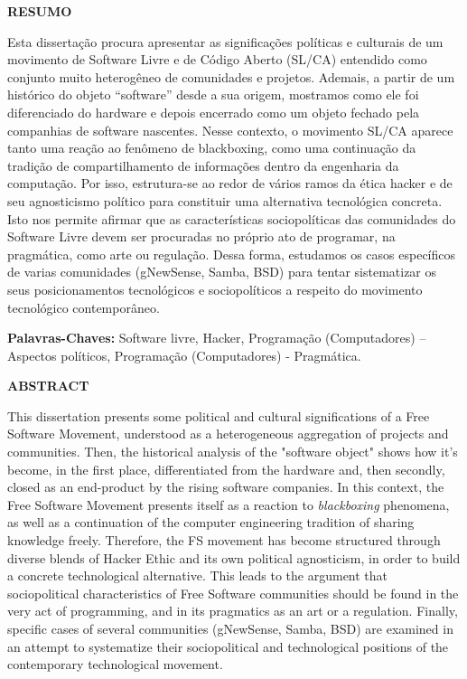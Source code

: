 \begin{center} \textbf{RESUMO} \end{center}

\vspace*{.5cm}

Esta dissertação procura apresentar as significações políticas e culturais de um movimento de Software Livre e de Código Aberto (SL/CA) entendido como conjunto muito heterogêneo de comunidades e projetos. Ademais, a partir de um histórico do objeto “software” desde a sua origem, mostramos como ele foi diferenciado do hardware e depois encerrado como um objeto fechado pela companhias de software nascentes. Nesse contexto, o movimento SL/CA aparece tanto uma reação ao fenômeno de blackboxing, como uma continuação da tradição de compartilhamento de informações dentro da engenharia da computação. Por isso, estrutura-se ao redor de vários ramos da ética hacker e de seu agnosticismo político para constituir uma alternativa tecnológica concreta. Isto nos permite afirmar que as características sociopolíticas das comunidades do Software Livre devem ser procuradas no próprio ato de programar, na pragmática, como arte ou regulação. Dessa forma, estudamos os casos específicos de varias comunidades (gNewSense, Samba, BSD) para tentar sistematizar os seus posicionamentos tecnológicos e sociopolíticos a respeito do movimento tecnológico contemporâneo.

\textbf{Palavras-Chaves:} Software livre, Hacker, Programação (Computadores) – Aspectos políticos, Programação (Computadores) - Pragmática.

\newpage

\begin{center} \textbf{ABSTRACT} \end{center}

\vspace*{.5cm}

This dissertation presents some political and cultural significations of a Free Software Movement, understood as a heterogeneous aggregation of projects and communities. Then, the historical analysis of the "software object" shows how it's become, in the first place, differentiated from the hardware and, then secondly, closed as an end-product by the rising software companies. In this context, the Free Software Movement presents itself as a reaction to \emph{blackboxing} phenomena, as well as a continuation of the computer engineering tradition of sharing knowledge freely. Therefore, the FS movement has become structured through diverse blends of Hacker Ethic and its own political agnosticism, in order to build a concrete technological alternative. This leads to the argument that sociopolitical characteristics of Free Software communities should be found in the very act of programming, and in its pragmatics as an art or a regulation. Finally, specific cases of several communities (gNewSense, Samba, BSD) are examined in an attempt to systematize their sociopolitical and technological positions of the contemporary technological movement.

